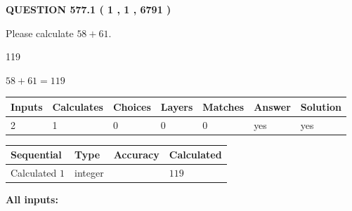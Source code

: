 \documentclass[12pt]{article}
\begin{document}
\vspace{0.2in}
  
{\textbf{\Large{QUESTION
577.1 
 ( 1 , 1 , 6791 )
}}}
  
  
 
Please calculate $ %
58 +  %
61 $.
 
 
 
\noindent{}
 
 

119
 
 
\noindent{}
 
 

 
 
 
\noindent{}
 
 

$ %
58 +  %
61=   %
119$
 
 
\noindent{}
 
 

 
   
   
   
   
\noindent\begin{tabular}{|l|l|l|l|l|l|l|}
 \hline
Inputs & Calculates & Choices & Layers & Matches & Answer & Solution \\ \hline
 2  & 
 1  & 
 0
  & 
 0  & 
 0  & 
  yes & 
  yes 
  \\ \hline
 \end{tabular}
   
   
   
   
\noindent{}
   
   
  
  
\noindent\begin{tabular}{|l|l|l|l|}
\hline
 Sequential & Type & Accuracy & Calculated \\ 
\hline
 
 
  Calculated $  1 $ & integer &  & 
  $ 119 $ 
 \\  \hline  
 \end{tabular}
   
   
   
   
\noindent\vspace{0.1in}\hspace{-0.08in} {\textbf{\Large{All inputs: }}}
   
\end{document}
